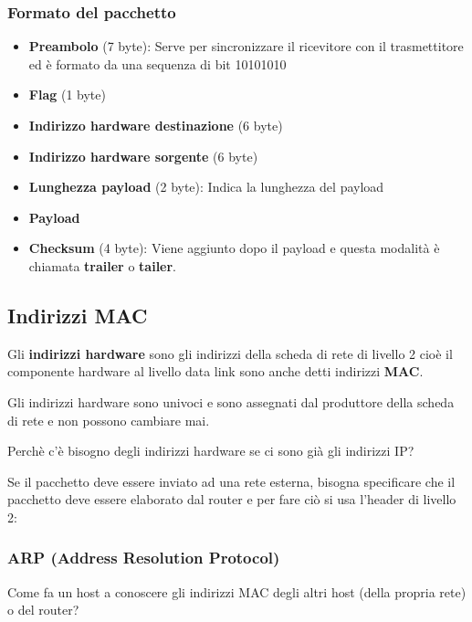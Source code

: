 \documentclass[a4paper]{article}
\begin{document}
\subsubsection{Formato del pacchetto}
\label{05-12-D1}
\begin{itemize}
  \item \textbf{Preambolo} (7 byte): Serve per sincronizzare il ricevitore con il trasmettitore
    ed è formato da una sequenza di bit 10101010
  \item \textbf{Flag} (1 byte) 
  \item \textbf{Indirizzo hardware destinazione} (6 byte)
  \item \textbf{Indirizzo hardware sorgente} (6 byte)
  \item \textbf{Lunghezza payload} (2 byte): Indica la lunghezza del payload
  \item \textbf{Payload}
  \item \textbf{Checksum} (4 byte): Viene aggiunto dopo il payload e questa modalità
    è chiamata \textbf{trailer} o \textbf{tailer}.
\end{itemize}

\subsection{Indirizzi MAC}
\begin{definition}
  Gli \textbf{indirizzi hardware} sono gli indirizzi della scheda di rete di livello 2 
  cioè il componente hardware al livello data link sono anche detti indirizzi
  \textbf{MAC}.

  Gli indirizzi hardware sono univoci e sono assegnati dal produttore della scheda
  di rete e non possono cambiare mai.
\end{definition}

\vspace{1em}
\noindent
Perchè c'è bisogno degli indirizzi hardware se ci sono già gli indirizzi IP?

Se il pacchetto deve essere inviato ad una rete esterna, bisogna specificare che
il pacchetto deve essere elaborato dal router e per fare ciò si usa l'header di
livello 2:
\label{05-12-D2}

\subsubsection{ARP (Address Resolution Protocol)}
Come fa un host a conoscere gli indirizzi MAC degli altri host (della propria rete)
o del router?
\end{document}
